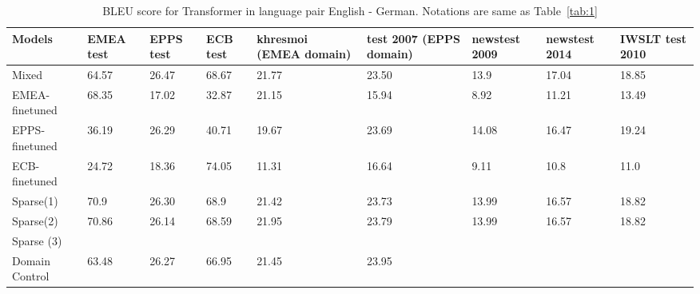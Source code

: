 \documentclass[11pt,a4paper]{article}
\begin{document}
\begin{table}
\begin{center}
 \begin{tabularx}{\textwidth}{|| X | X | X | X | X | X | X | X | X ||} 
 \hline
 Models & EMEA test & EPPS test & ECB test & khresmoi (EMEA domain) & test 2007 (EPPS domain) & newstest 2009 & newstest 2014 & IWSLT test 2010 \\ [0.5ex] 
 \hline\hline
 Mixed & 64.57 & 26.47 & 68.67 & 21.77 & 23.50 & 13.9 & 17.04 & 18.85 \\
 \hline
 EMEA-finetuned & 68.35 & 17.02 & 32.87 & 21.15 & 15.94 & 8.92 & 11.21 & 13.49 \\
 \hline
 EPPS-finetuned & 36.19 & 26.29 & 40.71 & 19.67 & 23.69 & 14.08 & 16.47 & 19.24 \\
 \hline
 ECB-finetuned & 24.72 & 18.36 & 74.05 & 11.31 & 16.64 & 9.11 & 10.8 & 11.0 \\
 \hline
 Sparse(1) & 70.9 & 26.30 & 68.9 & 21.42 & 23.73 & 13.99 & 16.57 & 18.82 \\
 \hline
 Sparse(2) & 70.86 & 26.14 & 68.59 & 21.95 & 23.79 & 13.99 & 16.57 & 18.82 \\
 \hline
 Sparse (3) &  &  &  &  &  &  &  & \\
 \hline
 Domain Control & 63.48 & 26.27 & 66.95 & 21.45 & 23.95 & & & \\
 \hline
\end{tabularx}
\end{center}
\caption{BLEU score for Transformer in language pair English - German. Notations are same as Table~\ref{tab:1}}
\label{tab:2}
\end{table}
\end{document}
